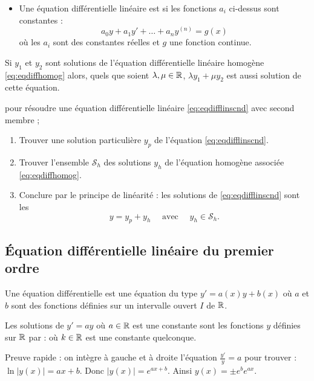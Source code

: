\documentclass[10pt,class=article,crop=false]{standalone}
\begin{document}
\begin{multicols}{2}
\begin{itemize}
	
	\item Une équation différentielle linéaire est  si
	les fonctions $a_i$ ci-dessus sont constantes :
	$$a_0y+a_1y'+\dots +a_ny^{(n)} = g(x)$$
	où les $a_i$ sont des constantes réelles et $g$ une fonction continue.
\end{itemize}

\begin{proposition}
	Si $y_1$ et $y_2$ sont solutions de l'équation différentielle linéaire homogène
	\eqref{eq:eqdiffhomog}
	alors, quels que soient $\lambda,\mu \in \mathbb{R}$, $\lambda y_1 + \mu y_2$ est aussi solution de cette équation.
\end{proposition}

 pour résoudre une équation différentielle linéaire \eqref{eq:eqdifflinscnd} avec second membre ;
\begin{enumerate}
	\item Trouver une solution particulière $y_p$ de l'équation \eqref{eq:eqdifflinscnd}.
	\item Trouver l'ensemble $\mathcal{S}_h$ des solutions $y_h$ de l'équation homogène associée \eqref{eq:eqdiffhomog}.
    \item Conclure par le principe de linéarité : les solutions de \eqref{eq:eqdifflinscnd} sont les 
    $$y = y_p + y_h \quad \text{ avec } \quad  y_h \in \mathcal{S}_h.$$
\end{enumerate}



\subsection{Équation différentielle linéaire du premier ordre}

Une équation différentielle  est une équation du type $y'=a(x)y + b(x)$ où $a$ et $b$ sont des fonctions définies sur un intervalle ouvert $I$ de $\mathbb{R}$.

\begin{theoreme}[$y' = a y$]
	\label{th:eqdifflinordre1cst}
	Les solutions de $y' = a y$ où $a \in \mathbb{R}$ est une constante sont les fonctions $y$ définies sur $\mathbb{R}$ par :
	où $k\in \mathbb{R}$ est une constante quelconque.
\end{theoreme}

Preuve rapide : on intègre à gauche et à droite l'équation $\frac{y'}{y} =  a$
pour trouver : $\ln |y(x)| = ax+b$.
Donc $|y(x)| = e^{ax+b}$. Ainsi $y(x) = \pm e^b e^{ax}$.


\end{multicols}
\end{document}
